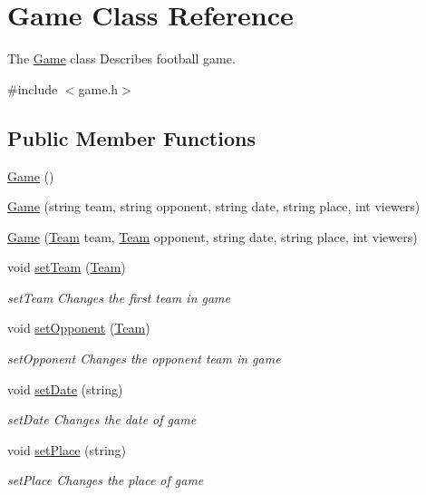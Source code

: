 \hypertarget{class_game}{\section{Game Class Reference}
\label{class_game}
}


The \hyperlink{class_game}{Game} class Describes football game.  




{\ttfamily \#include $<$game.\-h$>$}

\subsection*{Public Member Functions}
\begin{DoxyCompactItemize}
\item 
\hyperlink{class_game_ad59df6562a58a614fda24622d3715b65}{Game} ()
\item 
\hyperlink{class_game_a6cd2361c92c3e0ad4c7a068d3b345d37}{Game} (string team, string opponent, string date, string place, int viewers)
\item 
\hyperlink{class_game_a599909ae61dafc383d9443162377060a}{Game} (\hyperlink{class_team}{Team} team, \hyperlink{class_team}{Team} opponent, string date, string place, int viewers)
\item 
void \hyperlink{class_game_a85b937fc817b0cbbc09ee0d50c1c88d6}{set\-Team} (\hyperlink{class_team}{Team})
\begin{DoxyCompactList}\small\item\em set\-Team Changes the first team in game \end{DoxyCompactList}\item 
void \hyperlink{class_game_afce9509cf97e6770a01b371dba1b6bc0}{set\-Opponent} (\hyperlink{class_team}{Team})
\begin{DoxyCompactList}\small\item\em set\-Opponent Changes the opponent team in game \end{DoxyCompactList}\item 
void \hyperlink{class_game_a69878d05e15dbd4c7f630a1e22c7cefe}{set\-Date} (string)
\begin{DoxyCompactList}\small\item\em set\-Date Changes the date of game \end{DoxyCompactList}\item 
void \hyperlink{class_game_ab68d186027e5196b47cf1c7074b95fc0}{set\-Place} (string)
\begin{DoxyCompactList}\small\item\em set\-Place Changes the place of game \end{DoxyCompactList}\item 

\end{DoxyCompactItemize}
